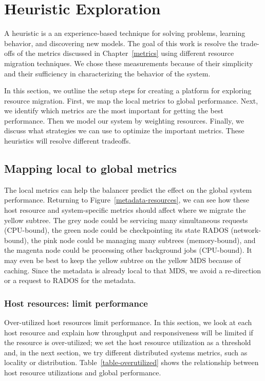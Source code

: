 \chapter{Heuristic Exploration}
\label{heuristic}
A heuristic is a an experience-based technique for solving problems, learning behavior, and discovering new models. The goal of this work is resolve the trade-offs of the metrics discussed in Chapter~\ref{metrics} using different resource migration techniques. We chose these measurements because of their simplicity and their sufficiency in characterizing the behavior of the system. 

In this section, we outline the setup steps for creating a platform for exploring resource migration. First, we map the local metrics to global performance. Next, we identify which metrics are the most important for getting the best performance. Then we model our system by weighting resources. Finally, we discuss what strategies we can use to optimize the important metrics. These heuristics will resolve different tradeoffs. 

\section{Mapping local to global metrics}
The local metrics can help the balancer predict the effect on the global system performance. Returning to Figure~\ref{metadata-resources}, we can see how these host resource and system-specific metrics should affect where we migrate the yellow subtree. The grey node could be servicing many simultaneous requests (CPU-bound), the green node could be checkpointing its state RADOS (network-bound), the pink node could be managing many subtrees (memory-bound), and the magenta node could be processing other background jobs (CPU-bound). It may even be best to keep the yellow subtree on the yellow MDS because of caching. Since the metadata is already local to that MDS, we avoid a re-direction or a request to RADOS for the metadata. 

\subsection*{Host resources: limit performance}
Over-utilized host resources limit performance. In this section, we look at each host resource and explain how throughput and responsiveness will be limited if the resource is over-utilized; we set the host resource utilization as a threshold and, in the next section, we try different distributed systems metrics, such as locality or distribution.  Table~\ref{table-overutilized} shows the relationship between host resource utilizations and global performance. 

